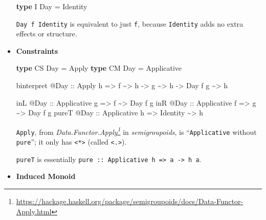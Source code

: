 \documentclass[]{article}
\newenvironment{Shaded}{}{}
\newcommand{\DataTypeTok}[1]{\textcolor[rgb]{0.56,0.13,0.00}{#1}}
\newcommand{\KeywordTok}[1]{\textcolor[rgb]{0.00,0.44,0.13}{\textbf{#1}}}
\newcommand{\NormalTok}[1]{#1}
\newcommand{\OperatorTok}[1]{\textcolor[rgb]{0.40,0.40,0.40}{#1}}
\newcommand{\OtherTok}[1]{\textcolor[rgb]{0.00,0.44,0.13}{#1}}
\renewcommand{\href}[2]{#2\footnote{\url{#1}}}
\begin{document}
\begin{itemize}
\begin{Shaded}
\begin{Highlighting}[]
\KeywordTok{type} \DataTypeTok{I} \DataTypeTok{Day} \OtherTok{=} \DataTypeTok{Identity}
\end{Highlighting}
\end{Shaded}

  \texttt{Day\ f\ Identity} is equivalent to just \texttt{f}, because
  \texttt{Identity} adds no extra effects or structure.
\item
  \textbf{Constraints}

\begin{Shaded}
\begin{Highlighting}[]
\KeywordTok{type} \DataTypeTok{CS} \DataTypeTok{Day} \OtherTok{=} \DataTypeTok{Apply}
\KeywordTok{type} \DataTypeTok{CM} \DataTypeTok{Day} \OtherTok{=} \DataTypeTok{Applicative}

\NormalTok{binterpret }\OperatorTok{@}\DataTypeTok{Day}
\OtherTok{    ::} \DataTypeTok{Apply}\NormalTok{ h}
    \OtherTok{=>}\NormalTok{ f }\OperatorTok{\textasciitilde{}>}\NormalTok{ h}
    \OtherTok{{-}>}\NormalTok{ g }\OperatorTok{\textasciitilde{}>}\NormalTok{ h}
    \OtherTok{{-}>} \DataTypeTok{Day}\NormalTok{ f g }\OperatorTok{\textasciitilde{}>}\NormalTok{ h}

\NormalTok{inL   }\OperatorTok{@}\DataTypeTok{Day}\OtherTok{ ::} \DataTypeTok{Applicative}\NormalTok{ g }\OtherTok{=>}\NormalTok{ f        }\OperatorTok{\textasciitilde{}>} \DataTypeTok{Day}\NormalTok{ f g}
\NormalTok{inR   }\OperatorTok{@}\DataTypeTok{Day}\OtherTok{ ::} \DataTypeTok{Applicative}\NormalTok{ f }\OtherTok{=>}\NormalTok{ g        }\OperatorTok{\textasciitilde{}>} \DataTypeTok{Day}\NormalTok{ f g}
\NormalTok{pureT }\OperatorTok{@}\DataTypeTok{Day}\OtherTok{ ::} \DataTypeTok{Applicative}\NormalTok{ h }\OtherTok{=>} \DataTypeTok{Identity} \OperatorTok{\textasciitilde{}>}\NormalTok{ h}
\end{Highlighting}
\end{Shaded}

  \texttt{Apply}, from
  \emph{\href{https://hackage.haskell.org/package/semigroupoids/docs/Data-Functor-Apply.html}{Data.Functor.Apply}}
  in \emph{semigroupoids}, is ``\texttt{Applicative} without \texttt{pure}''; it
  only has \texttt{\textless{}*\textgreater{}} (called
  \texttt{\textless{}.\textgreater{}}).

  \texttt{pureT} is essentially
  \texttt{pure\ ::\ Applicative\ h\ =\textgreater{}\ a\ -\textgreater{}\ h\ a}.
\item
  \textbf{Induced Monoid}


\end{itemize}
\end{document}
